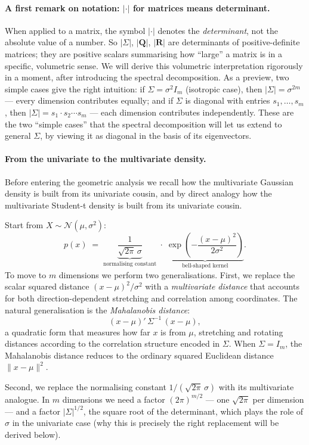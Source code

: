 \documentclass[11pt, a4paper, oneside]{article}
\newcommand{\mR}{\mathbf{R}}
\newcommand{\mQ}{\mathbf{Q}}
\begin{document}
\paragraph{A first remark on notation: $|\cdot|$ for matrices means determinant.}
When applied to a matrix, the symbol $|\cdot|$ denotes the
\emph{determinant}, not the absolute value of a number. So $|\Sigma|$,
$|\mQ|$, $|\mR|$ are determinants of positive-definite matrices; they
are positive scalars summarising how ``large'' a matrix is in a
specific, volumetric sense. We will derive this volumetric
interpretation rigorously in a moment, after introducing the spectral
decomposition. As a preview, two simple cases give the right
intuition: if $\Sigma = \sigma^{2} I_m$ (isotropic case), then
$|\Sigma| = \sigma^{2m}$ — every dimension contributes equally; and if
$\Sigma$ is diagonal with entries $s_1, \ldots, s_m$, then
$|\Sigma| = s_1 \cdot s_2 \cdots s_m$ — each dimension contributes
independently. These are the two ``simple cases'' that the spectral
decomposition will let us extend to general $\Sigma$, by viewing it as
diagonal in the basis of its eigenvectors.

\paragraph{From the univariate to the multivariate density.}
Before entering the geometric analysis we recall how the multivariate
Gaussian density is built from its univariate cousin, and by direct
analogy how the multivariate Student-t density is built from its
univariate cousin.

Start from $X \sim \mathcal{N}(\mu, \sigma^{2})$:
\[
p(x) \;=\; \underbrace{\frac{1}{\sqrt{2\pi}\,\sigma}}_{\text{normalising constant}}
\;\cdot\;
\underbrace{\exp\!\left(-\frac{(x-\mu)^{2}}{2\sigma^{2}}\right)}_{\text{bell-shaped kernel}}.
\]
To move to $m$ dimensions we perform two generalisations. First, we
replace the scalar squared distance $(x-\mu)^{2}/\sigma^{2}$ with a
\emph{multivariate distance} that accounts for both direction-dependent
stretching and correlation among coordinates. The natural generalisation
is the \emph{Mahalanobis distance}:
\[
(x - \mu)'\,\Sigma^{-1}\,(x - \mu),
\]
a quadratic form that measures how far $x$ is from $\mu$, stretching
and rotating distances according to the correlation structure encoded
in $\Sigma$. When $\Sigma = I_m$, the Mahalanobis distance reduces to
the ordinary squared Euclidean distance $\|x - \mu\|^{2}$.

Second, we replace the normalising constant $1/(\sqrt{2\pi}\,\sigma)$
with its multivariate analogue. In $m$ dimensions we need a factor
$(2\pi)^{m/2}$ — one $\sqrt{2\pi}$ per dimension — and a factor
$|\Sigma|^{1/2}$, the square root of the determinant, which plays the
role of $\sigma$ in the univariate case (why this is precisely the right
replacement will be derived below).
\end{document}
